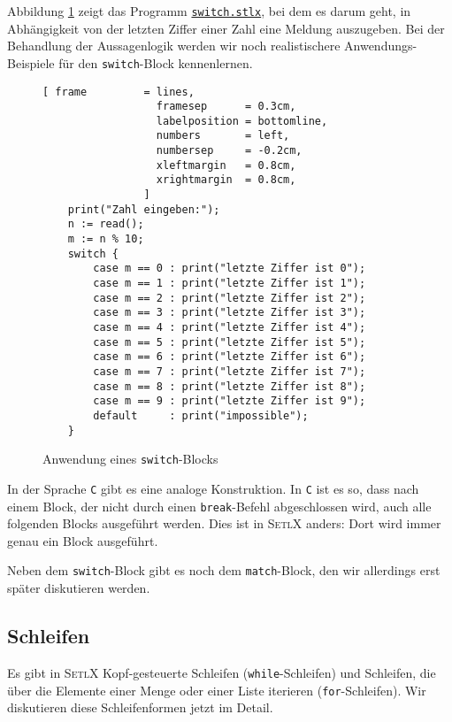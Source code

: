 Abbildung \ref{fig:switch.stlx} zeigt das Programm
\href{https://github.com/karlstroetmann/Logik/blob/master/SetlX/switch.stlx}{\texttt{switch.stlx}},
bei dem es darum  geht, in Abhängigkeit von der letzten Ziffer einer Zahl eine Meldung auszugeben.  Bei
der Behandlung der Aussagenlogik werden wir noch realistischere Anwendungs-Beispiele für den
\texttt{switch}-Block kennenlernen.

\begin{figure}[!ht]
\centering
\begin{Verbatim}[ frame         = lines, 
                  framesep      = 0.3cm, 
                  labelposition = bottomline,
                  numbers       = left,
                  numbersep     = -0.2cm,
                  xleftmargin   = 0.8cm,
                  xrightmargin  = 0.8cm,
                ]
    print("Zahl eingeben:");
    n := read();
    m := n % 10;
    switch {
        case m == 0 : print("letzte Ziffer ist 0");
        case m == 1 : print("letzte Ziffer ist 1");
        case m == 2 : print("letzte Ziffer ist 2");
        case m == 3 : print("letzte Ziffer ist 3");
        case m == 4 : print("letzte Ziffer ist 4");
        case m == 5 : print("letzte Ziffer ist 5");
        case m == 6 : print("letzte Ziffer ist 6");
        case m == 7 : print("letzte Ziffer ist 7");
        case m == 8 : print("letzte Ziffer ist 8");
        case m == 9 : print("letzte Ziffer ist 9");
        default     : print("impossible");
    }
\end{Verbatim}
\vspace*{-0.3cm}
\caption{Anwendung eines \texttt{switch}-Blocks}
\label{fig:switch.stlx}
\end{figure}

In der Sprache \texttt{C} gibt es eine  analoge Konstruktion.
 In \texttt{C} ist es so, dass nach einem
Block, der nicht durch einen \texttt{break}-Befehl abgeschlossen wird, auch alle folgenden Blocks
ausgeführt werden.  Dies ist in \textsc{SetlX} anders: Dort wird immer genau ein Block
ausgeführt.

Neben dem \texttt{switch}-Block gibt es noch dem \texttt{match}-Block, den wir allerdings
erst später diskutieren werden.

\subsection{Schleifen}
Es gibt in \textsc{SetlX} Kopf-gesteuerte Schleifen (\texttt{while}-Schleifen)
und Schleifen, die über die Elemente einer Menge oder einer Liste  iterieren (\texttt{for}-Schleifen).
Wir diskutieren diese  Schleifenformen jetzt im Detail.

